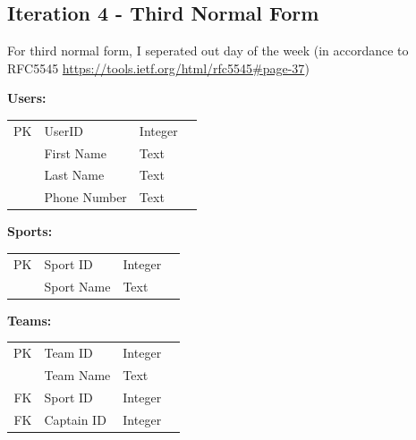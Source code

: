 \documentclass[10pt]{article}
\begin{document}
            \subsection{Iteration 4 - Third Normal Form}

                For third normal form, I seperated out day of the week (in accordance to RFC5545 \url{https://tools.ietf.org/html/rfc5545#page-37})

                \begin{center}
                    \textbf{Users:}\\
                    \begin{tabular}{ | r | l | l | p{10cm} } 
                        \cline{1-3}
                        PK & UserID & Integer & \\ \cline{1-3}
                        & First Name & Text & \\ \cline{1-3}
                        & Last Name & Text & \\ \cline{1-3}
                        & Phone Number & Text & \\ \cline{1-3}
                    \end{tabular}
                \end{center}

                \begin{center}
                    \textbf{Sports:}\\
                    \begin{tabular}{ | r | l | l | p{10cm} } 
                        \cline{1-3}
                        PK & Sport ID & Integer & \\ \cline{1-3}
                        & Sport Name & Text & \\ \cline{1-3}
                    \end{tabular}
                \end{center}

                \begin{center}
                    \textbf{Teams:}
                    \begin{tabular}{ | r | l | l | p{10cm} } 
                        \cline{1-3}
                        PK & Team ID & Integer & \\ \cline{1-3}
                        & Team Name & Text & \\ \cline{1-3}
                        FK & Sport ID & Integer & \\ \cline{1-3}
                        FK & Captain ID & Integer & \\ \cline{1-3}
                    \end{tabular}
                \end{center}
\end{document}
